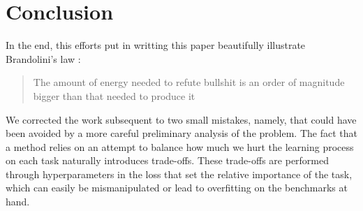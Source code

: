 \documentclass[11pt]{article}
\begin{document}
\section{Conclusion}



In the end, this efforts put in writting this paper beautifully illustrate Brandolini's law : 
\begin{quote}
    The amount of energy needed to refute bullshit is an order of magnitude bigger than that needed to produce it
\end{quote}
We corrected the work subsequent to two small mistakes, namely, that could have been avoided by a more careful preliminary analysis of the problem. The fact that a method relies on an attempt to balance how much we hurt the learning process on each task naturally introduces trade-offs. These trade-offs are performed through hyperparameters in the loss that set the relative importance of the task, which can easily be mismanipulated or lead to overfitting on the benchmarks at hand.



\nocite{*}
\printbibliography
\end{document}
